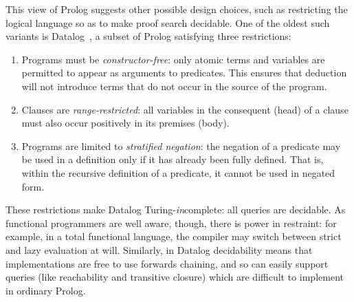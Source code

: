 This view of Prolog suggests other possible design choices, such as
restricting the logical language so as to make proof search decidable. One of
the oldest such variants is Datalog~\cite{datalog}, a subset of Prolog
satisfying three restrictions:

\begin{enumerate}
\item Programs must be \emph{constructor-free}: only atomic terms and variables
  are permitted to appear as arguments to predicates. This ensures that deduction
  will not introduce terms that do not occur in the source of the
  program.

\item Clauses are \emph{range-restricted}: all variables in the
  consequent (head) of a clause must also occur positively in its
  premises (body).

\item Programs are limited to \emph{stratified negation}: the
  negation of a predicate may be used in a definition only if it has
  already been fully defined. That is, within the recursive
  definition of a predicate, it cannot be used in negated form.
\end{enumerate}

These restrictions make Datalog Turing-\emph{in}complete: all queries are
decidable. As functional programmers are well aware, though, there is power in
restraint: for example, in a total functional language, the compiler may switch
between strict and lazy evaluation at will. Similarly, in Datalog decidability
means that implementations are free to use forwards chaining, and so can easily
support queries (like reachability and transitive closure) which are difficult
to implement in ordinary Prolog.

%

